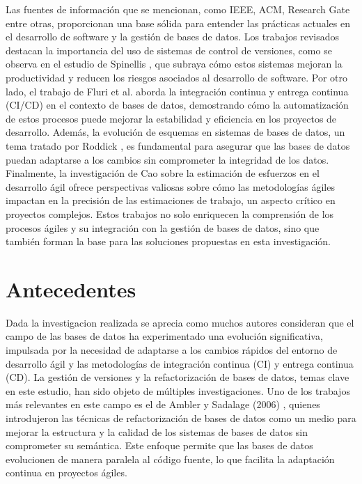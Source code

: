 \documentclass{IEEEtran}
\begin{document}
Las fuentes de información que se mencionan, como IEEE, ACM, Research Gate entre otras, proporcionan una base sólida para entender las prácticas actuales en el desarrollo de software y la gestión de bases de datos. Los trabajos revisados destacan la importancia del uso de sistemas de control de versiones, como se observa en el estudio de Spinellis \cite{spinellis2005version}, que subraya cómo estos sistemas mejoran la productividad y reducen los riesgos asociados al desarrollo de software. Por otro lado, el trabajo de Fluri et al. \cite{fluri2023measuring} aborda la integración continua y entrega continua (CI/CD) en el contexto de bases de datos, demostrando cómo la automatización de estos procesos puede mejorar la estabilidad y eficiencia en los proyectos de desarrollo. Además, la evolución de esquemas en sistemas de bases de datos, un tema tratado por Roddick \cite{roddick1992schema}, es fundamental para asegurar que las bases de datos puedan adaptarse a los cambios sin comprometer la integridad de los datos. Finalmente, la investigación de Cao \cite{cao2022estimating} sobre la estimación de esfuerzos en el desarrollo ágil ofrece perspectivas valiosas sobre cómo las metodologías ágiles impactan en la precisión de las estimaciones de trabajo, un aspecto crítico en proyectos complejos. Estos trabajos no solo enriquecen la comprensión de los procesos ágiles y su integración con la gestión de bases de datos, sino que también forman la base para las soluciones propuestas en esta investigación.


\section{Antecedentes}

Dada la investigacion realizada se aprecia como muchos autores consideran que el campo de las bases de datos ha experimentado una evolución significativa, impulsada por la necesidad de adaptarse a los cambios rápidos del entorno de desarrollo ágil y las metodologías de integración continua (CI) y entrega continua (CD). La gestión de versiones y la refactorización de bases de datos, temas clave en este estudio, han sido objeto de múltiples investigaciones. Uno de los trabajos más relevantes en este campo es el de Ambler y Sadalage (2006) \cite{ambler2006refactoring}, quienes introdujeron las técnicas de refactorización de bases de datos como un medio para mejorar la estructura y la calidad de los sistemas de bases de datos sin comprometer su semántica. Este enfoque permite que las bases de datos evolucionen de manera paralela al código fuente, lo que facilita la adaptación continua en proyectos ágiles. 
\end{document}
